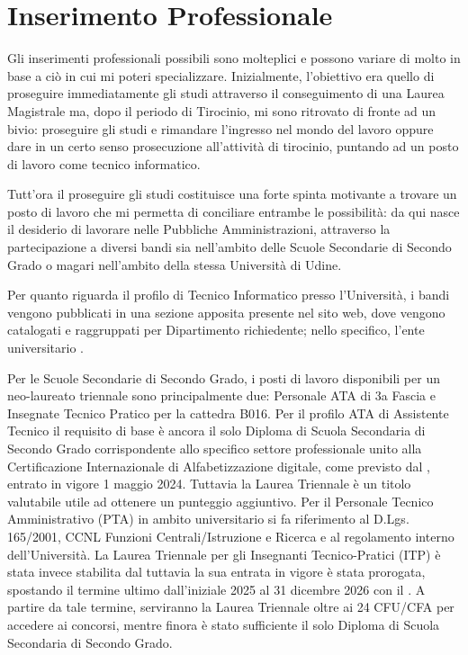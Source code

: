     \section{Inserimento Professionale}
        \par
            Gli inserimenti professionali possibili sono molteplici e possono variare di molto in base a ciò in cui mi poteri specializzare. Inizialmente, l'obiettivo era quello di proseguire immediatamente gli studi attraverso il conseguimento di una Laurea Magistrale ma, dopo il periodo di Tirocinio, mi sono ritrovato di fronte ad un bivio: proseguire gli studi e rimandare l'ingresso nel mondo del lavoro oppure dare in un certo senso prosecuzione all'attività di tirocinio, puntando ad un posto di lavoro come tecnico informatico. 
        \par
            Tutt'ora il proseguire gli studi costituisce una forte spinta motivante a trovare un posto di lavoro che mi permetta di conciliare entrambe le possibilità: da qui nasce il desiderio di lavorare nelle Pubbliche Amministrazioni, attraverso la partecipazione a diversi bandi sia nell'ambito delle Scuole Secondarie di Secondo Grado o magari nell'ambito della stessa Università di Udine.
        \par
            Per quanto riguarda il profilo di Tecnico Informatico presso l'Università, i bandi vengono pubblicati in una sezione apposita presente nel sito web, dove vengono catalogati e raggruppati per Dipartimento richiedente; nello specifico, l'ente universitario \cite{DARU}.
        \par
            Per le Scuole Secondarie di Secondo Grado, i posti di lavoro disponibili per un neo-laureato triennale sono principalmente due: Personale ATA di 3a Fascia e Insegnate Tecnico Pratico per la cattedra B016. \newline
            Per il profilo ATA di Assistente Tecnico il requisito di base è ancora il solo Diploma di Scuola Secondaria di Secondo Grado corrispondente allo specifico settore professionale unito alla Certificazione Internazionale di Alfabetizzazione digitale, come previsto dal \cite{CCNL-Istruzione/Ricerca}, entrato in vigore 1 maggio 2024. Tuttavia la Laurea Triennale è un titolo valutabile utile ad ottenere un punteggio aggiuntivo. Per il Personale Tecnico Amministrativo (PTA) in ambito universitario si fa riferimento al D.Lgs. 165/2001, CCNL Funzioni Centrali/Istruzione e Ricerca e al regolamento interno dell'Università.\newline
            La Laurea Triennale per gli Insegnanti Tecnico-Pratici (ITP) è stata invece stabilita dal \cite{D.L.59/2017} tuttavia la sua entrata in vigore è stata prorogata, spostando il termine ultimo dall'iniziale 2025 al 31 dicembre 2026 con il \cite{DecretoMilleproroghe}. A partire da tale termine, serviranno la Laurea Triennale oltre ai 24 CFU/CFA per accedere ai concorsi, mentre finora è stato sufficiente il solo Diploma di Scuola Secondaria di Secondo Grado. 
